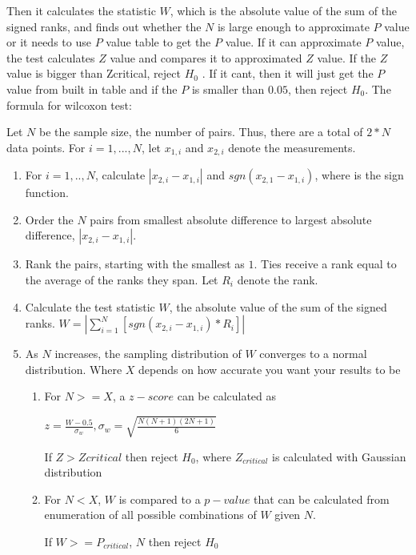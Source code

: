\documentclass[12pt]{article}
\begin{document}
Then it calculates the statistic $W$, which is the absolute value of the sum of the signed ranks, and finds out whether the $N$ is large enough to approximate $P$ value or it needs to use $P$ value table to get the $P$ value. If it can approximate $P$ value, the test calculates $Z$ value and compares it to approximated $Z$ value. If the $Z$ value is bigger than Zcritical, reject $H_0$ . If it cant, then it will just get the $P$ value from built in table and if the $P$ is smaller than $0.05$, then reject $H_0$. The formula for wilcoxon test:

Let $N$ be the sample size, the number of pairs. Thus, there are a total of $2*N$ data points. For $i=1,...,N$, let $x_{1, i}$ and $x_{2, i}$ denote the measurements.

\begin{enumerate}
\item
For $i=1, .., N$, calculate $|x_{2,i} - x_{1,i}|$ and $sgn(x_{2,1} - x_{1,i})$, where  is the sign function.
\item
Order the $N$ pairs from smallest absolute difference to largest absolute difference, $|x_{2,i} - x_{1,i}|$.
\item
Rank the pairs, starting with the smallest as $1$. Ties receive a rank equal to the average of the ranks they span. Let $R_i$ denote the rank.
\item
Calculate the test statistic $W$, the absolute value of the sum of the signed ranks. $W=|\sum\limits_{i=1}^{N} [sgn(x_{2,i} - x_{1,i})*R_i]|$
\item
As $N$ increases, the sampling distribution of $W$ converges to a normal distribution. Where $X$ depends on how accurate you want your results to be
\begin{enumerate}
\item
For $N >= X$, a $z-score$ can be calculated as

$z=\frac{W-0.5}{\sigma_w},\sigma_w = \sqrt{\frac{N(N + 1)(2N + 1)}{6}}$

If $Z > Zcritical$ then reject $H_0$, where $Z_{critical}$ is calculated with Gaussian distribution

\item
For $N < X$, $W$  is compared to a $p-value$ that can be calculated from enumeration of all possible combinations of $W$ given $N$.

If $W >= P_{critical}$, $N$ then reject $H_0$
\end{enumerate}
\end{enumerate}
\end{document}
